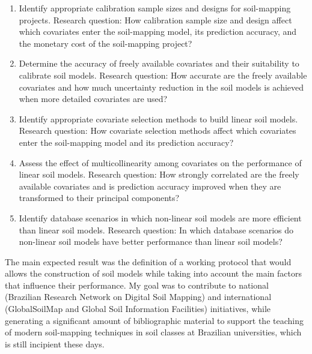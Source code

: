\begin{enumerate}
\item Identify appropriate calibration sample sizes and designs for soil-mapping projects.\newline
Research question: How calibration sample size and design affect which covariates enter the
soil-mapping model, its prediction accuracy, and the monetary cost of the soil-mapping project?

\item Determine the accuracy of freely available covariates and their suitability to calibrate
soil models.\newline
Research question: How accurate are the freely available covariates and how much uncertainty
reduction in the soil models is achieved when more detailed covariates are used?

\item Identify appropriate covariate selection methods to build linear soil models.\newline
Research question: How covariate selection methods affect which covariates enter the soil-mapping
model and its prediction accuracy?

\item Assess the effect of multicollinearity among covariates on the performance of linear
soil models.\newline
Research question: How strongly correlated are the freely available covariates and is prediction
accuracy improved when they are transformed to their principal components?

\item Identify database scenarios in which non-linear soil models are more efficient than
linear soil models.\newline
Research question: In which database scenarios do non-linear soil models have better
performance than linear soil models?
\end{enumerate}

The main expected result was the definition of a working protocol that would allows the construction
of soil models while taking into account the main factors that influence their performance.
My goal was to contribute to national (Brazilian Research Network on Digital Soil Mapping) and
international (GlobalSoilMap and Global Soil Information Facilities) initiatives, while generating a
significant amount of bibliographic material to support the teaching of modern soil-mapping techniques
in soil classes at Brazilian universities, which is still incipient these days.

